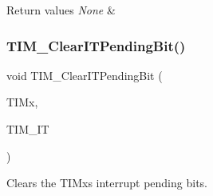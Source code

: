 \begin{DoxyRetVals}{Return values}
{\em None} & \\
\hline
\end{DoxyRetVals}
\mbox{\label{group___t_i_m___private___functions_ga9eb1e95af71ed380f51a2c6d585cc5d6}} 
\subsubsection{\texorpdfstring{TIM\_ClearITPendingBit()}{TIM\_ClearITPendingBit()}}
{\footnotesize\ttfamily void T\+I\+M\+\_\+\+Clear\+I\+T\+Pending\+Bit (\begin{DoxyParamCaption}\item[{\mbox{\hyperlink{struct_t_i_m___type_def}{T\+I\+M\+\_\+\+Type\+Def}} $\ast$}]{T\+I\+Mx,  }\item[{uint16\+\_\+t}]{T\+I\+M\+\_\+\+IT }\end{DoxyParamCaption})}



Clears the T\+I\+Mx\textquotesingle{}s interrupt pending bits. 


